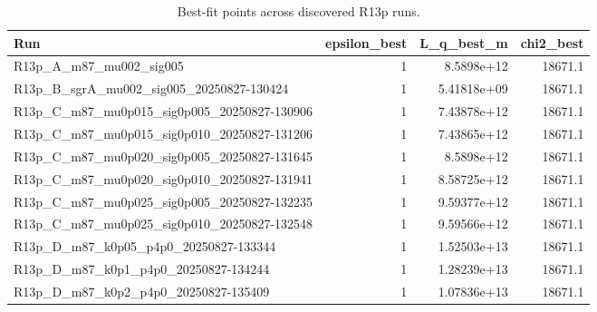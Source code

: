 \begin{table}[t]
\centering
\begin{tabular}{lrrr}
\toprule
Run & epsilon\_best & L\_q\_best\_m & chi2\_best \\
\midrule
R13p\_A\_m87\_mu002\_sig005 & 1 & 8.5898e+12 & 18671.1 \\
R13p\_B\_sgrA\_mu002\_sig005\_20250827-130424 & 1 & 5.41818e+09 & 18671.1 \\
R13p\_C\_m87\_mu0p015\_sig0p005\_20250827-130906 & 1 & 7.43878e+12 & 18671.1 \\
R13p\_C\_m87\_mu0p015\_sig0p010\_20250827-131206 & 1 & 7.43865e+12 & 18671.1 \\
R13p\_C\_m87\_mu0p020\_sig0p005\_20250827-131645 & 1 & 8.5898e+12 & 18671.1 \\
R13p\_C\_m87\_mu0p020\_sig0p010\_20250827-131941 & 1 & 8.58725e+12 & 18671.1 \\
R13p\_C\_m87\_mu0p025\_sig0p005\_20250827-132235 & 1 & 9.59377e+12 & 18671.1 \\
R13p\_C\_m87\_mu0p025\_sig0p010\_20250827-132548 & 1 & 9.59566e+12 & 18671.1 \\
R13p\_D\_m87\_k0p05\_p4p0\_20250827-133344 & 1 & 1.52503e+13 & 18671.1 \\
R13p\_D\_m87\_k0p1\_p4p0\_20250827-134244 & 1 & 1.28239e+13 & 18671.1 \\
R13p\_D\_m87\_k0p2\_p4p0\_20250827-135409 & 1 & 1.07836e+13 & 18671.1 \\
\bottomrule
\end{tabular}

\caption{Best-fit points across discovered R13p runs.}
\label{tab:r13p_best_fit}
\end{table}
